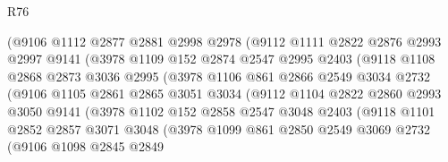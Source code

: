 \begin{lexlean}{R76}
\begin{coremodule}
                    (@9106
                      @1112
                      @2877
                      @2881
                      @2998
                      @2978
                      (@9112
                        @1111
                        @2822
                        @2876
                        @2993
                        @2997
                        @9141
                        (@3978
                          @1109
                          @152
                          @2874
                          @2547
                          @2995
                          @2403
                          (@9118
                            @1108
                            @2868
                            @2873
                            @3036
                            @2995
                            (@3978
                              @1106
                              @861
                              @2866
                              @2549
                              @3034
                              @2732
                              (@9106
                                @1105
                                @2861
                                @2865
                                @3051
                                @3034
                                (@9112
                                  @1104
                                  @2822
                                  @2860
                                  @2993
                                  @3050
                                  @9141
                                  (@3978
                                    @1102
                                    @152
                                    @2858
                                    @2547
                                    @3048
                                    @2403
                                    (@9118
                                      @1101
                                      @2852
                                      @2857
                                      @3071
                                      @3048
                                      (@3978
                                        @1099
                                        @861
                                        @2850
                                        @2549
                                        @3069
                                        @2732
                                        (@9106
                                          @1098
                                          @2845
                                          @2849

\end{coremodule}
\end{lexlean}
